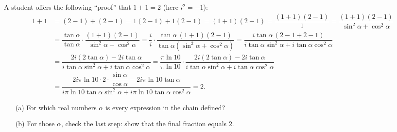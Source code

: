 A student offers the following ``proof'' that $1+1=2$ (here $i^2=-1$):
\begin{align*}
1+1&=(2-1)+(2-1)=1(2-1)+1(2-1)=(1+1)(2-1)=\dfrac{(1+1)(2-1)}{1}=\dfrac{(1+1)(2-1)}{\sin^2\alpha+\cos^2\alpha}\\
&=\dfrac{\tan\alpha}{\tan\alpha}\cdot\dfrac{(1+1)(2-1)}{\sin^2\alpha+\cos^2\alpha}=\dfrac{i}{i}\cdot\dfrac{\tan\alpha\,(1+1)(2-1)}{\tan\alpha\left(\sin^2\alpha+\cos^2\alpha\right)}=\dfrac{i\tan\alpha\,(2-1+2-1)}{i\tan\alpha\sin^2\alpha+i\tan\alpha\cos^2\alpha}\\
&=\dfrac{2i(2\tan\alpha)-2i\tan\alpha}{i\tan\alpha\sin^2\alpha+i\tan\alpha\cos^2\alpha}=\dfrac{\pi\ln10}{\pi\ln10}\cdot\dfrac{2i(2\tan\alpha)-2i\tan\alpha}{i\tan\alpha\sin^2\alpha+i\tan\alpha\cos^2\alpha}\\
&=\dfrac{2i\pi\ln10\cdot2\cdot\dfrac{\sin\alpha}{\cos\alpha}-2i\pi\ln10\tan\alpha}{i\pi\ln10\tan\alpha\sin^2\alpha+i\pi\ln10\tan\alpha\cos^2\alpha}=2.
\end{align*}
\begin{enumerate}
\item[(a)] For which real numbers $\alpha$ is every expression in the chain defined?
\item[(b)] For those $\alpha$, check the last step: show that the final fraction equals $2$.
\end{enumerate}
